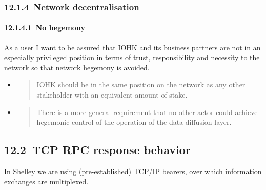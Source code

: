 \documentclass[]{article}
\let\oldparagraph\paragraph
\renewcommand{\paragraph}[1]{\oldparagraph{#1}\mbox{}}
\begin{document}
\hypertarget{network-decentralisation}{%
\subsubsection{​12.1.4​~Network
decentralisation}\label{network-decentralisation}}

\hypertarget{no-hegemony}{%
\paragraph{​12.1.4.1​~No hegemony}\label{no-hegemony}}

As a user I want to be assured that IOHK and its business partners are
not in an especially privileged position in terms of trust,
responsibility and necessity to the network so that network hegemony is
avoided.

\begin{itemize}
\item
  \begin{quote}
  IOHK should be in the same position on the network as any other
  stakeholder with an equivalent amount of stake.
  \end{quote}
\item
  \begin{quote}
  There is a more general requirement that no other actor could achieve
  hegemonic control of the operation of the data diffusion layer.
  \end{quote}
\end{itemize}

\hypertarget{tcp-rpc-response-behavior}{%
\subsection{​12.2​~TCP RPC response
behavior}\label{tcp-rpc-response-behavior}}

In Shelley we are using (pre-established) TCP/IP bearers, over which
information exchanges are multiplexed.
\end{document}
